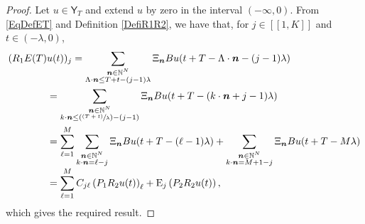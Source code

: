 \documentclass[10pt]{amsart}
\newcommand{\Psfrac}[2]{(\sfrac{#1}{#2})}
\newcommand{\bn}{\boldsymbol{n}}
\newcommand{\llbracket}{[\![}
\newcommand{\rrbracket}{]\!]}
\theoremstyle{plain}
\theoremstyle{definition}
\newcommand{\Epsilon}{\mathrm E}
\begin{document}
\begin{proof}
Let $u \in \mathsf Y_T$ and extend $u$ by zero in the interval $(-\infty, 0)$. From \eqref{EqDefET} and Definition \ref{DefiR1R2}, we have that, for $j \in \llbracket 1, K\rrbracket$ and $t \in (-\lambda, 0)$,
\begin{align*}
(R_1 E(T) &u(t))_{j} = \sum_{\substack{\bn \in \mathbb N^N \\ \Lambda \cdot \bn \leq T + t - (j - 1)\lambda}} \Xi_{\bn} B u(t + T - \Lambda \cdot \bn - (j - 1)\lambda)  \\
& = \sum_{\substack{\bn \in \mathbb N^N \\ k \cdot \bn \leq \Psfrac{(T + t)}{\lambda} - (j - 1)}} \Xi_{\bn} B u(t + T - (k \cdot \bn + j - 1)\lambda)  \\
& = \sum_{\ell=1}^M \sum_{\substack{\bn \in \mathbb N^N \\ k \cdot \bn = \ell - j}} \Xi_{\bn} B u(t + T - (\ell - 1)\lambda) + \sum_{\substack{\bn \in \mathbb N^N \\ k \cdot \bn = M+1 - j}} \Xi_{\bn} B u(t + T - M \lambda)  \\[-3pt]
& = \sum_{\ell=1}^M C_{j\ell} \left(P_1 R_2 u(t)\right)_{\ell} + \Epsilon_j \left(P_2 R_2 u(t)\right),
\end{align*}
which gives the required result.
\end{proof}
\end{document}
